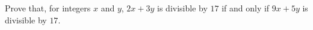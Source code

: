 Prove that, for integers $x$ and $y$, $2x+3y$ is divisible by $17$ if and only if $9x+5y$ is divisible by $17$.
